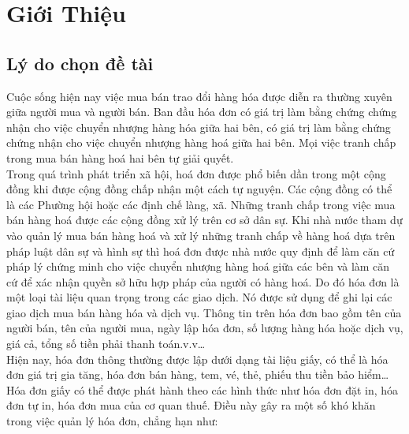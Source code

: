 \section{Giới Thiệu}
\subsection{Lý do chọn đề tài}
Cuộc sống hiện nay việc mua bán trao đổi hàng hóa được diễn ra thường xuyên giữa người mua và người bán. Ban đầu hóa đơn có giá trị làm bằng chứng chứng nhận cho việc chuyển nhượng hàng hóa giữa hai bên, có giá trị làm bằng chứng chứng nhận cho việc chuyển nhượng hàng hoá giữa hai bên. Mọi việc tranh chấp trong mua bán hàng hoá hai bên tự giải quyết. \\
\indent Trong quá trình phát triển xã hội, hoá đơn được phổ biến dần trong một cộng đồng khi được cộng đồng chấp nhận một cách tự nguyện. Các cộng đồng có thể là các Phường hội hoặc các định chế làng, xã. Những tranh chấp trong việc mua bán hàng hoá được các cộng đồng xử lý trên cơ sở dân sự. Khi nhà nước tham dự vào quản lý mua bán hàng hoá và xử lý những tranh chấp về hàng hoá dựa trên pháp luật dân sự và hình sự thì hoá đơn được nhà nước quy định để làm căn cứ pháp lý chứng minh cho việc chuyển nhượng hàng hoá giữa các bên và làm căn cứ để xác nhận quyền sở hữu hợp pháp của người có hàng hoá. Do đó hóa đơn là một loại tài liệu quan trọng trong các giao dịch. Nó được sử dụng để ghi lại các giao dịch mua bán hàng hóa và dịch vụ. Thông tin trên hóa đơn bao gồm tên của người bán, tên của người mua, ngày lập hóa đơn, số lượng hàng hóa hoặc dịch vụ, giá cả, tổng số tiền phải thanh toán.v.v\dots \\
\indent Hiện nay, hóa đơn thông thường được lập dưới dạng tài liệu giấy, có thể là hóa đơn giá trị gia tăng, hóa đơn bán hàng, tem, vé, thẻ, phiếu thu tiền bảo hiểm\dots Hóa đơn giấy có thể được phát hành theo các hình thức như hóa đơn đặt in, hóa đơn tự in, hóa đơn mua của cơ quan thuế. Điều này gây ra một số khó khăn trong việc quản lý hóa đơn, chẳng hạn như:
